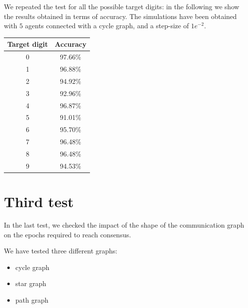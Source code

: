 \documentclass[a4paper,11pt,oneside]{book}
\begin{document}
We repeated the test for all the possible target digits: in the following we show the results obtained in terms of accuracy.
The simulations have been obtained with $5$ agents connected with a cycle graph, and a step-size of $1e^{-2}$.

\begin{center}
\begin{tabular}{|c|c|}
\hline
Target digit & Accuracy \\
\hline
0 & 97.66\% \\
1 & 96.88\% \\
2 & 94.92\% \\
3 & 92.96\% \\
4 & 96.87\% \\
5 & 91.01\% \\
6 & 95.70\% \\
7 & 96.48\%\\
8 & 96.48\% \\
9 & 94.53\% \\
\hline
\end{tabular}
\end{center}

\section{Third test}
In the last test, we checked the impact of the shape of the communication graph on the epochs required to reach consensus.

\bigskip
We have tested three different graphs:
\begin{itemize}
\item cycle graph
\item star graph
\item path graph
\end{itemize}
\end{document}
